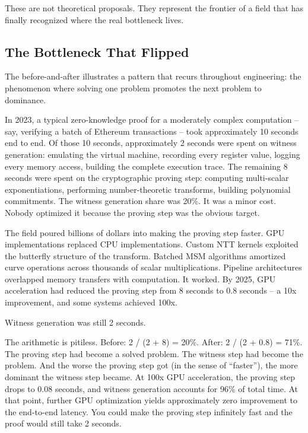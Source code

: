\documentclass[
  11pt,
  openany]{report}
\begin{document}
These are not theoretical proposals. They represent the frontier of a field that
has finally recognized where the real bottleneck lives.

\subsection{The Bottleneck That Flipped}\label{the-bottleneck-that-flipped}

The before-and-after illustrates a pattern that recurs throughout engineering:
the phenomenon where solving one problem promotes the next problem to dominance.

In 2023, a typical zero-knowledge proof for a moderately complex computation --
say, verifying a batch of Ethereum transactions -- took approximately 10 seconds
end to end. Of those 10 seconds, approximately 2 seconds were spent on witness
generation: emulating the virtual machine, recording every register value,
logging every memory access, building the complete execution trace. The
remaining 8 seconds were spent on the cryptographic proving step: computing
multi-scalar exponentiations, performing number-theoretic transforms, building
polynomial commitments. The witness generation share was 20\%. It was a minor
cost. Nobody optimized it because the proving step was the obvious target.

The field poured billions of dollars into making the proving step faster. GPU
implementations replaced CPU implementations. Custom NTT kernels exploited the
butterfly structure of the transform. Batched MSM algorithms amortized curve
operations across thousands of scalar multiplications. Pipeline architectures
overlapped memory transfers with computation. It worked. By 2025, GPU
acceleration had reduced the proving step from 8 seconds to 0.8 seconds -- a 10x
improvement, and some systems achieved 100x.

Witness generation was still 2 seconds.

The arithmetic is pitiless. Before: 2 / (2 + 8) = 20\%. After: 2 / (2 + 0.8) =
71\%. The proving step had become a solved problem. The witness step had become
the problem. And the worse the proving step got (in the sense of ``faster''),
the more dominant the witness step became. At 100x GPU acceleration, the proving
step drops to 0.08 seconds, and witness generation accounts for 96\% of total
time. At that point, further GPU optimization yields approximately zero
improvement to the end-to-end latency. You could make the proving step
infinitely fast and the proof would still take 2 seconds.
\end{document}
